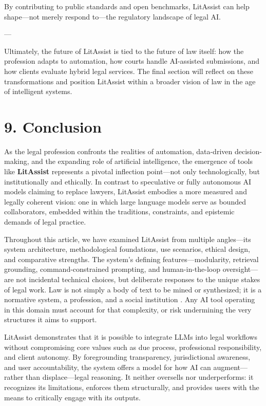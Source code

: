 \documentclass[12pt,a4paper]{article}
\begin{document}
By contributing to public standards and open benchmarks, LitAssist can help shape—not merely respond to—the regulatory landscape of legal AI.

---

Ultimately, the future of LitAssist is tied to the future of law itself: how the profession adapts to automation, how courts handle AI-assisted submissions, and how clients evaluate hybrid legal services. The final section will reflect on these transformations and position LitAssist within a broader vision of law in the age of intelligent systems.


\section*{9. Conclusion}

As the legal profession confronts the realities of automation, data-driven decision-making, and the expanding role of artificial intelligence, the emergence of tools like \textbf{LitAssist} represents a pivotal inflection point—not only technologically, but institutionally and ethically. In contrast to speculative or fully autonomous AI models claiming to replace lawyers, LitAssist embodies a more measured and legally coherent vision: one in which large language models serve as bounded collaborators, embedded within the traditions, constraints, and epistemic demands of legal practice.

Throughout this article, we have examined LitAssist from multiple angles—its system architecture, methodological foundations, use scenarios, ethical design, and comparative strengths. The system's defining features—modularity, retrieval grounding, command-constrained prompting, and human-in-the-loop oversight—are not incidental technical choices, but deliberate responses to the unique stakes of legal work. Law is not simply a body of text to be mined or synthesized; it is a normative system, a profession, and a social institution \cite{Casey2020}. Any AI tool operating in this domain must account for that complexity, or risk undermining the very structures it aims to support.

LitAssist demonstrates that it is possible to integrate LLMs into legal workflows without compromising core values such as due process, professional responsibility, and client autonomy. By foregrounding transparency, jurisdictional awareness, and user accountability, the system offers a model for how AI can augment—rather than displace—legal reasoning. It neither oversells nor underperforms: it recognizes its limitations, enforces them structurally, and provides users with the means to critically engage with its outputs.
\end{document}
